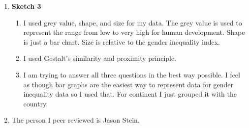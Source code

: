 \documentclass[11pt]{article}
\begin{document}
\begin{enumerate}
  \item \textbf{Sketch 3}
  \begin{enumerate}
    \item I used grey value, shape, and size for my data. The grey value is used to represent the range from low to very high for human development. Shape is just a bar chart. Size is relative to the gender inequality index.
    \item I used Gestalt's similarity and proximity principle.
    \item I am trying to answer all three questions in the best way possible. I feel as though bar graphs are the easiest way to represent data for gender inequality data so I used that. For continent I just grouped it with the country.
  \end{enumerate}
  
  \item The person I peer reviewed is Jason Stein.
  
\end{enumerate}
\end{document}
